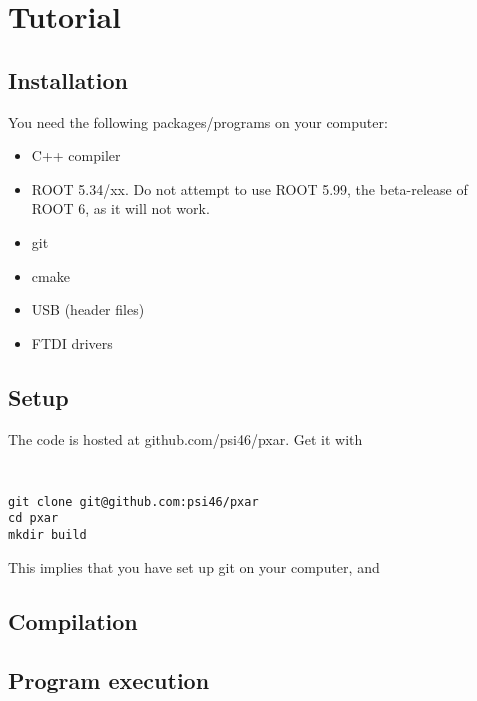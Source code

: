 \section{Tutorial}
\label{s:tutorial}

\subsection{Installation}
\label{ss:installation}

You need the following packages/programs on your computer: 
\begin{itemize}
  \item C++ compiler
  \item ROOT 5.34/xx. Do not attempt to use ROOT 5.99, the
    beta-release of ROOT 6, as it will not work. 
  \item git
  \item cmake
  \item USB (header files)
  \item FTDI drivers
\end{itemize}


\subsection{Setup}
\label{ss:setup}
The \pxar code is hosted at github.com/psi46/pxar. Get it with 
{\tt
\begin{verbatim}
git clone git@github.com:psi46/pxar 
cd pxar
mkdir build
\end{verbatim}
}
This implies that you have set up git on your computer, and 


\subsection{Compilation}
\label{ss:compilation}


\subsection{Program execution}
\label{ss:run}
